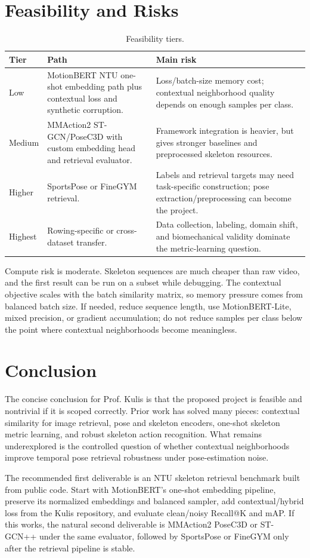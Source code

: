 \documentclass[11pt]{article}
\begin{document}
\section{Feasibility and Risks}

\begin{table}[htbp]
\small
\centering
\caption{Feasibility tiers.}
\label{tab:risk}
\begin{tabularx}{\textwidth}{@{}p{2.4cm}Y Y@{}}
\toprule
Tier & Path & Main risk \\
\midrule
Low & MotionBERT NTU one-shot embedding path plus contextual loss and synthetic corruption. & Loss/batch-size memory cost; contextual neighborhood quality depends on enough samples per class. \\
Medium & MMAction2 ST-GCN/PoseC3D with custom embedding head and retrieval evaluator. & Framework integration is heavier, but gives stronger baselines and preprocessed skeleton resources. \\
Higher & SportsPose or FineGYM retrieval. & Labels and retrieval targets may need task-specific construction; pose extraction/preprocessing can become the project. \\
Highest & Rowing-specific or cross-dataset transfer. & Data collection, labeling, domain shift, and biomechanical validity dominate the metric-learning question. \\
\bottomrule
\end{tabularx}
\end{table}

Compute risk is moderate. Skeleton sequences are much cheaper than raw video, and the first result can be run on a subset while debugging. The contextual objective scales with the batch similarity matrix, so memory pressure comes from balanced batch size. If needed, reduce sequence length, use MotionBERT-Lite, mixed precision, or gradient accumulation; do not reduce samples per class below the point where contextual neighborhoods become meaningless.

\section{Conclusion}

The concise conclusion for Prof. Kulis is that the proposed project is feasible and nontrivial if it is scoped correctly. Prior work has solved many pieces: contextual similarity for image retrieval, pose and skeleton encoders, one-shot skeleton metric learning, and robust skeleton action recognition. What remains underexplored is the controlled question of whether contextual neighborhoods improve temporal pose retrieval robustness under pose-estimation noise.

The recommended first deliverable is an NTU skeleton retrieval benchmark built from public code. Start with MotionBERT's one-shot embedding pipeline, preserve its normalized embeddings and balanced sampler, add contextual/hybrid loss from the Kulis repository, and evaluate clean/noisy Recall@K and mAP. If this works, the natural second deliverable is MMAction2 PoseC3D or ST-GCN++ under the same evaluator, followed by SportsPose or FineGYM only after the retrieval pipeline is stable.



\end{document}
